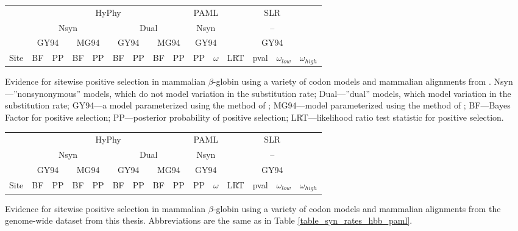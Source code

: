\bbtable
\centering \footnotesize
\begin{tabular}{rrrrrrrrrrrrrrr}
\toprule
 & \multicolumn{8}{c}{HyPhy} & \multicolumn{2}{c}{PAML} & \multicolumn{4}{c}{SLR} \\
 \cmidrule(r){2-9} \cmidrule(r){10-11} \cmidrule(r){12-15}
 & \multicolumn{4}{c}{Nsyn} & \multicolumn{4}{c}{Dual} & \multicolumn{2}{c}{Nsyn} & \multicolumn{4}{c}{--} \\
 \cmidrule(r){2-5} \cmidrule(r){6-9} \cmidrule(r){10-11} \cmidrule(r){12-15}
 & \multicolumn{2}{c}{GY94} & \multicolumn{2}{c}{MG94} & \multicolumn{2}{c}{GY94} & \multicolumn{2}{c}{MG94} 
 & \multicolumn{2}{c}{GY94} & \multicolumn{4}{c}{GY94} \\
\cmidrule(r){1-15}
Site & BF & PP & BF & PP & 
BF & PP & BF & PP & PP & $\omega$ & LRT & pval & $\omega_{low}$ & $\omega_{high}$ \\
  \midrule

\bottomrule
\end{tabular}
\caption{\scriptsize Evidence for sitewise positive selection in mammalian
  $\beta$-globin using a variety of codon models and mammalian
  alignments from \citet{Pond2005b}. Nsyn---''nonsynonymous'' models,
  which do not model variation in the \syn substitution rate;
  Dual---''dual'' models, which model variation in the \syn
  substitution rate; GY94---a model parameterized using the method of
  \citet{Goldman1994a}; MG94---model parameterized using the method of
  \citet{Muse1994}; BF---Bayes Factor for positive selection;
  PP---posterior probability of positive selection; LRT---likelihood
  ratio test statistic for positive selection.
\vspace*{1 cm}}
\label{table_syn_rates_hbb_paml}


\begin{tabular}{rrrrrrrrrrrrrrr}

\toprule
 & \multicolumn{8}{c}{HyPhy} & \multicolumn{2}{c}{PAML} & \multicolumn{4}{c}{SLR} \\
 \cmidrule(r){2-9} \cmidrule(r){10-11} \cmidrule(r){12-15}
 & \multicolumn{4}{c}{Nsyn} & \multicolumn{4}{c}{Dual} & \multicolumn{2}{c}{Nsyn} & \multicolumn{4}{c}{--} \\
 \cmidrule(r){2-5} \cmidrule(r){6-9} \cmidrule(r){10-11} \cmidrule(r){12-15}
 & \multicolumn{2}{c}{GY94} & \multicolumn{2}{c}{MG94} & \multicolumn{2}{c}{GY94} & \multicolumn{2}{c}{MG94} 
 & \multicolumn{2}{c}{GY94} & \multicolumn{4}{c}{GY94} \\
\cmidrule(r){1-15}
Site & BF & PP & BF & PP & 
BF & PP & BF & PP & PP & $\omega$ & LRT & pval & $\omega_{low}$ & $\omega_{high}$ \\
  \midrule

\bottomrule
\end{tabular}
\caption{\scriptsize Evidence for sitewise positive selection in mammalian
  $\beta$-globin using a variety of codon models and mammalian
  alignments from the genome-wide dataset from this
  thesis. Abbreviations are the same as in Table
  \ref{table_syn_rates_hbb_paml}.}
\label{table_syn_rates_hbb_ensembl}
\eetable

